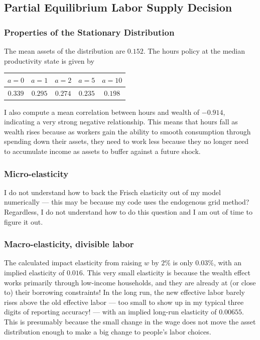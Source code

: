 \documentclass[12pt, letterpaper, parskip = full]{article}
\begin{document}
    \subsection{Partial Equilibrium Labor Supply Decision}

    \subsubsection{Properties of the Stationary Distribution}

    The mean assets of the distribution are \(0.152\). The hours policy at the median productivity state is given by

    \begin{center}
	\begin{tabular}{|c|c|c|c|c|}
		\hline
		\(a = 0\) & \(a = 1\) & \(a = 2\) & \(a = 5\) & \(a = 10\) \\
		\hline
		\(0.339\) & \(0.295\) & \(0.274\) & \(0.235\) & \(0.198\) \\
		\hline

	\end{tabular}
	\end{center}

    I also compute a mean correlation between hours and wealth of \(-0.914\), indicating a very strong negative relationship. This means that hours fall as wealth rises because as workers gain the ability to smooth consumption through spending down their assets, they need to work less because they no longer need to accumulate income as assets to buffer against a future shock. 

    \subsubsection{Micro-elasticity}

    I do not understand how to back the Frisch elasticity out of my model numerically --- this may be because my code uses the endogenous grid method? Regardless, I do not understand how to do this question and I am out of time to figure it out.

    \subsubsection{Macro-elasticity, divisible labor}

    The calculated impact elasticity from raising \(w\) by \(2\%\) is only \(0.03\%\), with an implied elasticity of \(0.016\). This very small elasticity is because the wealth effect works primarily through low-income households, and they are already at (or close to) their borrowing constraints! In the long run, the new effective labor barely rises above the old effective labor --- too small to show up in my typical three digits of reporting accuracy! --- with an implied long-run elasticity of \(0.00655\). This is presumably because the small change in the wage does not move the asset distribution enough to make a big change to people's labor choices.
\end{document}
